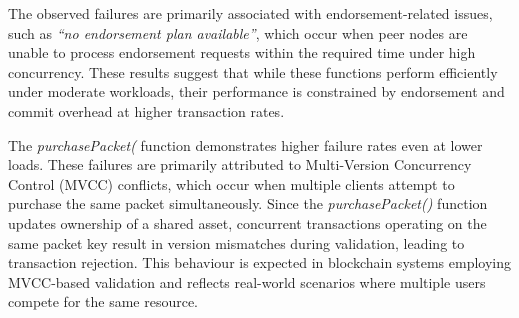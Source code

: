 \documentclass[12pt]{article}
\begin{document}
	
	The observed failures are primarily associated with endorsement-related issues, such as \textit{``no endorsement plan available''}, which occur when peer nodes are unable to process endorsement requests within the required time under high concurrency. These results suggest that while these functions perform efficiently under moderate workloads, their performance is constrained by endorsement and commit overhead at higher transaction rates.
	
	
	\begin{table}[h]
		\centering
		\caption{Performance Results for \texttt{packLotIntoPackets} (Payload: 91 bytes) under Varying Load}
		
		
		\label{tab:pack-loadtest}
	\end{table}
	
	
	The \textit{purchasePacket(} function demonstrates higher failure rates even at lower loads. These failures are primarily attributed to Multi-Version Concurrency Control (MVCC) conflicts, which occur when multiple clients attempt to purchase the same packet simultaneously. Since the \textit{purchasePacket()} function updates ownership of a shared asset, concurrent transactions operating on the same packet key result in version mismatches during validation, leading to transaction rejection. This behaviour is expected in blockchain systems employing MVCC-based validation and reflects real-world scenarios where multiple users compete for the same resource.
	
\end{document}

